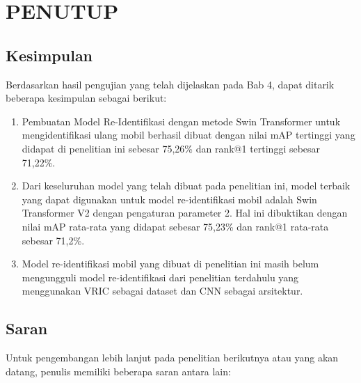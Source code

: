 \chapter{PENUTUP}
\label{chap:penutup}


\section{Kesimpulan}
\label{sec:kesimpulan}

Berdasarkan hasil pengujian yang telah dijelaskan pada Bab 4, dapat 
ditarik beberapa kesimpulan sebagai berikut:

\begin{enumerate}[nolistsep]

  \item Pembuatan Model Re-Identifikasi dengan metode Swin Transformer untuk 
  mengidentifikasi ulang mobil berhasil dibuat dengan nilai mAP tertinggi yang didapat 
  di penelitian ini sebesar 75,26\% dan rank@1 tertinggi sebesar 71,22\%.

  \item Dari keseluruhan model yang telah dibuat pada penelitian ini, 
  model terbaik yang dapat digunakan untuk model re-identifikasi mobil adalah 
  Swin Transformer V2 dengan pengaturan parameter 2. Hal ini dibuktikan dengan nilai 
  mAP rata-rata yang didapat sebesar 75,23\% dan rank@1 rata-rata sebesar 71,2\%.


  \item Model re-identifikasi mobil yang dibuat di penelitian ini masih belum mengungguli 
  model re-identifikasi dari penelitian terdahulu yang menggunakan VRIC sebagai dataset 
  dan CNN sebagai arsitektur.

\end{enumerate}

\section{Saran}
\label{chap:saran}

Untuk pengembangan lebih lanjut pada penelitian berikutnya atau yang akan datang, \linebreak
penulis memiliki beberapa saran antara lain:

